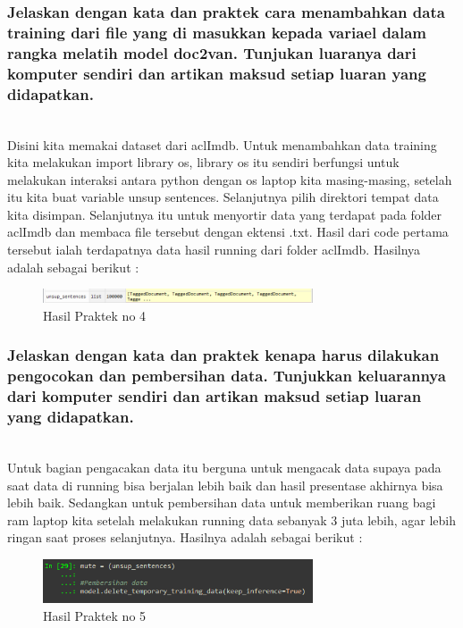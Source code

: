\subsubsection{Jelaskan dengan kata dan praktek cara menambahkan data training dari file yang di masukkan kepada variael dalam rangka melatih model doc2van. Tunjukan luaranya dari komputer sendiri dan artikan maksud setiap luaran yang didapatkan.}
\hfill\\

Disini kita memakai dataset dari aclImdb. Untuk menambahkan data training kita melakukan import library os, library os itu sendiri berfungsi untuk melakukan interaksi antara python dengan os laptop kita masing-masing, setelah itu kita buat variable unsup sentences. Selanjutnya pilih direktori tempat data kita disimpan. Selanjutnya itu untuk menyortir data yang terdapat pada folder aclImdb dan membaca file tersebut dengan ektensi .txt. Hasil dari code pertama tersebut ialah terdapatnya data hasil running dari folder aclImdb. Hasilnya adalah sebagai berikut :
\begin{figure}[H]
	\centering
	\includegraphics[width=8cm]{figures/1174083/figures5/40.png}
	\caption{Hasil Praktek no 4}
\end{figure}

\subsubsection{Jelaskan dengan kata dan praktek kenapa harus dilakukan pengocokan dan pembersihan data. Tunjukkan keluarannya dari komputer sendiri dan artikan maksud setiap luaran yang didapatkan.}
\hfill\\

Untuk bagian pengacakan data itu berguna untuk mengacak data supaya pada saat data di running bisa berjalan lebih baik dan hasil presentase akhirnya bisa lebih baik. Sedangkan untuk pembersihan data untuk memberikan ruang bagi ram laptop kita setelah melakukan running data sebanyak 3 juta lebih, agar lebih ringan saat proses selanjutnya. Hasilnya adalah sebagai berikut :
\begin{figure}[H]
	\centering
	\includegraphics[width=8cm]{figures/1174083/figures5/41.png}
	\caption{Hasil Praktek no 5}
\end{figure}

